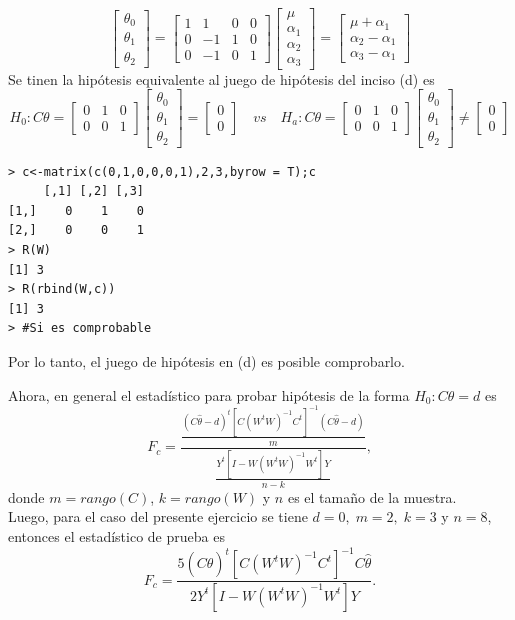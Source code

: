 \documentclass[12pt,a4paper]{report}
\begin{document}
\begin{itemize}
\[
\begin{bmatrix}
\theta_0 \\ \theta_1 \\ \theta_2 
\end{bmatrix}=
\begin{bmatrix}
1 & 1 & 0 & 0 \\
0 & -1 & 1 & 0 \\
0 & -1 & 0 & 1  
\end{bmatrix}
\begin{bmatrix}
\mu \\ \alpha_1 \\ \alpha_2 \\ \alpha_3 
\end{bmatrix} = 
\begin{bmatrix}
\mu +\alpha_1 \\ 
\alpha_2 - \alpha_1 \\ 
\alpha_3 - \alpha_1
\end{bmatrix}
\]
Se tinen la hipótesis equivalente al juego de hipótesis del inciso (d) es
$$H_0:C\theta=\begin{bmatrix}
0 & 1 & 0 \\
0 & 0 & 1
\end{bmatrix}\begin{bmatrix}
\theta_0 \\ \theta_1 \\ \theta_2 
\end{bmatrix}=\begin{bmatrix}
0 \\ 0
\end{bmatrix} \quad vs \quad H_a:C\theta=\begin{bmatrix}
0 & 1 & 0 \\
0 & 0 & 1
\end{bmatrix}\begin{bmatrix}
\theta_0 \\ \theta_1 \\ \theta_2 
\end{bmatrix}\neq \begin{bmatrix}
0 \\ 0
\end{bmatrix}$$

\begin{verbatim}
> c<-matrix(c(0,1,0,0,0,1),2,3,byrow = T);c
     [,1] [,2] [,3]
[1,]    0    1    0
[2,]    0    0    1
> R(W) 
[1] 3
> R(rbind(W,c)) 
[1] 3
> #Si es comprobable
\end{verbatim}
Por lo tanto, el juego de hipótesis en (d) es posible comprobarlo.

Ahora, en general el estadístico para probar hipótesis de la forma $H_0:C\theta = d$ es
$$F_c=\frac{\frac{(C\hat{\theta}-d)^t[C(W^tW)^{-1}C^t]^{-1}(C\hat{\theta}-d)}{m}}{\frac{Y^t[I-W(W^tW)^{-1}W^t]Y}{n-k}},$$
donde $m=rango(C)$, $k=rango(W)$ y $n$ es el tamaño de la muestra.\\

Luego, para el caso del presente ejercicio se tiene $d=0,\; m=2, \; k=3$ y $n=8$, entonces el estadístico de prueba es
$$F_c=\frac{5(C\hat{\theta})^t[C(W^tW)^{-1}C^t]^{-1}C\hat{\theta}}{2Y^t[I-W(W^tW)^{-1}W^t]Y}.$$


\end{itemize}
\end{document}
